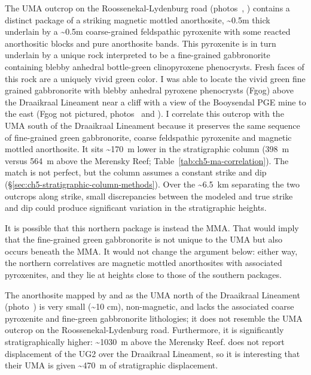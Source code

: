 The UMA outcrop on the Roossenekal-Lydenburg road (photos~, )
contains a distinct package of a striking magnetic mottled anorthosite,
\textasciitilde0.5m thick underlain by a \textasciitilde0.5m
coarse-grained feldspathic pyroxenite with some reacted anorthositic
blocks and pure anorthosite bands. This pyroxenite is in turn underlain
by a unique rock interpreted to be a fine-grained gabbronorite
containing blebby anhedral bottle-green clinopyroxene phenocrysts. Fresh
faces of this rock are a uniquely vivid green color. I was able to
locate the vivid green fine grained gabbronorite with blebby anhedral
pyroxene phenocrysts (Fgog) above the Draaikraal Lineament near a cliff
with a view of the Booysendal PGE mine to the east (Fgog not pictured,
photos~ and ). I correlate this outcrop with the UMA south of the Draaikraal Lineament
because it preserves the same sequence of fine-grained green gabbronorite,
coarse feldspathic pyroxenite and magnetic mottled anorthosite. It sits
\textasciitilde170~m lower in the stratigraphic column (398~m versus 564~m
above the Merensky Reef; Table~\ref{tab:ch5-ma-correlation}). The match is not
perfect, but the column assumes a constant strike and dip
(\S\ref{sec:ch5-stratigraphic-column-methods}). Over the \textasciitilde6.5~km
separating the two outcrops along strike, small discrepancies between the
modeled and true strike and dip could produce significant variation in the
stratigraphic heights.

It is possible that this northern package is instead the MMA. That would
imply that the fine-grained green gabbronorite is not unique to the UMA but
also occurs beneath the MMA. It would not change the argument below: either
way, the northern correlatives are magnetic mottled anorthosites with
associated pyroxenites, and they lie at heights close to those of the
southern packages.

The anorthosite mapped by \citet{vandermerwe2007} and \citet{latypovetal2022}
as the UMA north of the Draaikraal Lineament (photo~) is very small
(\textasciitilde10 cm), non-magnetic, and lacks the associated
coarse pyroxenite and fine-green gabbronorite lithologies; it does not
resemble the UMA outcrop on the Roossenekal-Lydenburg road. Furthermore,
it is significantly stratigraphically higher: \textasciitilde1030~m above the Merensky Reef. \citet{vandermerwe2007} does not report
displacement of the UG2 over the Draaikraal Lineament, so it is
interesting that their UMA is given \textasciitilde470~m of stratigraphic displacement.

